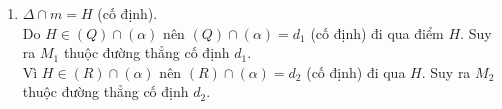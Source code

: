 \begin{bt}
{\begin{enumerate}
\begin{enumerate}[TH1.]
				Do đó $M_1$ thuộc đường thẳng cố định $d_1$ đi qua $C$ và song song với $\Delta$ ( và $m$).\\
				Lại có, theo giả thiết $MS_2$ luôn phải cắt $(\alpha)$ tại $M_2$, nên $(R) \cap (\alpha)=d_2$.\\
				Do $\Delta \parallel (\alpha)$, nên $SS_2$ cắt $(\alpha)$. Gọi $SS_2 \cap (\alpha)=D$ cố định.\\
				Ta có $C \in (R) \cap (\alpha)$ và $\Delta \subset (R),m \subset (\alpha)$. Mà $\Delta \parallel m$ nên $(R) \cap (\alpha)=d_2$ và $d_2$ đi qua $D$ và $d_2\parallel \Delta\parallel m$.\\
				Do đó $M_2$ thuộc đường thẳng cố định $d_2$ đi qua $D$ và song song với $\Delta$ (và $m$).
				\item $\Delta \cap m=H$ (cố định).\\
				Do $H \in (Q) \cap (\alpha)$ nên $(Q) \cap (\alpha)=d_1$ (cố định) đi qua điểm $H$. Suy ra $M_1$ thuộc đường thẳng cố định $d_1$.\\
				Vì $H \in (R) \cap (\alpha)$ nên $(R) \cap (\alpha)=d_2$ (cố định) đi qua $H$. Suy ra $M_2$ thuộc đường thẳng cố định $d_2$.
			\end{enumerate}
		\end{enumerate}
	}
\end{bt}

